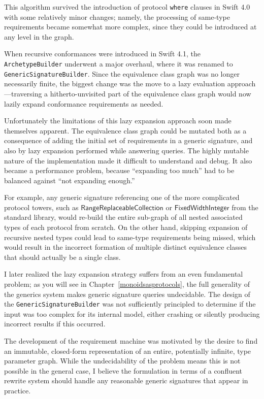 \documentclass[a4paper,headsepline,bibliography=totoc,toc=flat,fleqn,twoside=semi]{scrbook}
\theoremstyle{definition}
\theoremstyle{definition}
\theoremstyle{definition}
\newcommand{\proto}[1]{\bm{\mathsf{#1}}}
\begin{document}
This algorithm survived the introduction of protocol \texttt{where} clauses in Swift 4.0 with some relatively minor changes; namely, the processing of same-type requirements became somewhat more complex, since they could be introduced at any level in the graph.

When recursive conformances were introduced in Swift 4.1, the \texttt{ArchetypeBuilder} underwent a major overhaul, where it was renamed to \texttt{GenericSignatureBuilder}. Since the equivalence class graph was no longer necessarily finite, the biggest change was the move to a lazy evaluation approach---traversing a hitherto-unvisited part of the equivalence class graph would now lazily expand conformance requirements as needed.

Unfortunately the limitations of this lazy expansion approach soon made themselves apparent. The equivalence class graph could be mutated both as a consequence of adding the initial set of requirements in a generic signature, and also by lazy expansion performed while answering queries. The highly mutable nature of the implementation made it difficult to understand and debug. It also became a performance problem, because ``expanding too much'' had to be balanced against ``not expanding enough.''

For example, any generic signature referencing one of the more complicated protocol towers, such as $\proto{RangeReplaceableCollection}$ or $\proto{FixedWidthInteger}$ from the standard library, would re-build the entire sub-graph of all nested associated types of each protocol from scratch. On the other hand, skipping expansion of recursive nested types could lead to same-type requirements being missed, which would result in the incorrect formation of multiple distinct equivalence classes that should actually be a single class.

I later realized the lazy expansion strategy suffers from an even fundamental problem; as you will see in Chapter~\ref{monoidsasprotocols}, the full generality of the generics system makes generic signature queries undecidable. The design of the \texttt{GenericSignatureBuilder} was not sufficiently principled to determine if the input was too complex for its internal model, either crashing or silently producing incorrect results if this occurred.

The development of the requirement machine was motivated by the desire to find an immutable, closed-form representation of an entire, potentially infinite, type parameter graph. While the undecidability of the problem means this is not possible in the general case, I believe the formulation in terms of a confluent rewrite system should handle any reasonable generic signatures that appear in practice.
\end{document}
